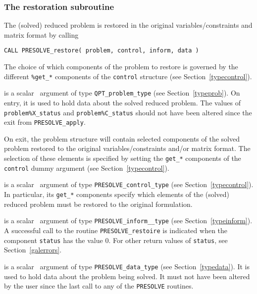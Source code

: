 \documentclass{galahad}
\newcommand{\packagename}{PRESOLVE}
\begin{document}

\subsubsection{The restoration subroutine}

The (solved) reduced problem is restored in the original variables/constraints
and matrix format by calling
\vspace*{1mm}

\hspace{8mm}
{\tt CALL \packagename\_restore( problem, control, inform, data )}
\vspace*{1mm}

The choice of which components of the problem to restore is governed by the
different {\tt \%get\_*} components of the {\tt control} structure (see
Section~\ref{typecontrol}).

\begin{description}
 is a scalar \intentinout\ argument of type
{\tt QPT\_problem\_type}
(see Section~\ref{typeprob}).
On entry, it is used to hold data about the solved reduced problem. The values
of {\tt problem\%X\_status} and {\tt problem\%C\_status} should not have been
altered since the exit from {\tt \packagename\_apply}.

\noindent
On exit, the problem structure will contain selected components of the solved
problem restored to the original variables/constraints and/or matrix format.
The selection of these elements is specified by setting the {\tt get\_*}
components of the {\tt control} dummy argument (see
Section~\ref{typecontrol}).

 is a scalar \intentinout\ argument of type
{\tt \packagename\_control\_type}
(see Section~\ref{typecontrol}).  In particular, its {\tt get\_*} components
specify which elements of the (solved) reduced problem must be restored to the
original formulation.

 is a scalar \intentinout\ argument of type
{\tt \packagename\_inform\_\_type}
(see Section~\ref{typeinform}). A successful call to the routine
{\tt \packagename\_restoire}
is indicated when the  component {\tt status} has the value 0.
For other return values of {\tt status}, see Section~\ref{galerrors}.

 is a scalar \intentinout\ argument of type
{\tt \packagename\_data\_type}
(see Section~\ref{typedata}). It is used to hold data about the problem being
solved. It must not have been altered by the user since the last call to
any of the {\tt \packagename} routines.

\end{description}
\end{document}
